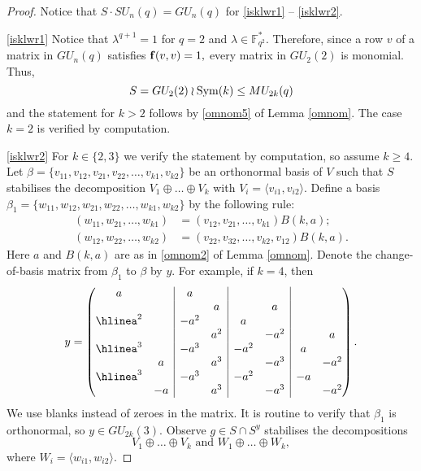 \begin{proof}
Notice that $S \cdot SU_n(q)=GU_n(q)$ for \eqref{isklwr1} -- \eqref{isklwr2}.  

\eqref{isklwr1} Notice that $\lambda^{q+1}=1$ for $q=2$ and $\lambda \in \mathbb{F}_{q^2}^*.$
Therefore, since  a row $v$ of a matrix in $GU_n(q)$ satisfies ${\bf f}(v,v)=1,$
every matrix in $GU_2(2)$ is  monomial. Thus, $$S=GU_2(2) \wr \mathrm{Sym}(k)\le MU_{2k}(q)$$ and  the statement for $k>2$ follows by \eqref{omnom5} of Lemma \ref{omnom}. The case $k=2$ is verified by computation.

\medskip

\eqref{isklwr2} For $k \in \{2,3\}$ we verify the statement by computation, so assume $k \ge 4.$ Let $\beta =\{v_{11}, v_{12}, v_{21}, v_{22}, \ldots, v_{k1}, v_{k2}\}$ be an orthonormal basis of $V$ such that $S$ stabilises the decomposition $V_1 \oplus \ldots \oplus V_k$ with $V_i=\langle v_{i1}, v_{i2} \rangle.$ Define a basis $\beta_1=\{w_{11}, w_{12}, w_{21}, w_{22}, \ldots, w_{k1}, w_{k2}\}$ by the following rule:
\begin{equation*}
\begin{split}
(w_{11}, w_{21}, \ldots, w_{k1})&=(v_{12}, v_{21}, \ldots, v_{k1})B(k,a); \\
(w_{12}, w_{22}, \ldots, w_{k2})&=(v_{22}, v_{32}, \ldots, v_{k2}, v_{12})B(k,a).
\end{split}
\end{equation*}
Here $a$ and $B(k,a)$ are as in \eqref{omnom2} of Lemma \ref{omnom}. Denote the change-of-basis matrix from $\beta_1$ to $\beta$ by $y$. For example, if $k=4$, then  
\begin{equation*}
y=
\begin{pmatrix}
a& \multicolumn{1}{c|}{}&a&\multicolumn{1}{c|}{}&&\multicolumn{1}{c|}{}&& \\
& \multicolumn{1}{c|}{}&&\multicolumn{1}{c|}{a}&&\multicolumn{1}{c|}{a}&& \\ \hline%
a^2& \multicolumn{1}{c|}{} &-a^2&\multicolumn{1}{c|}{}&a&\multicolumn{1}{c|}{}&& \\
  &\multicolumn{1}{c|}{} &&\multicolumn{1}{c|}{a^2}&&\multicolumn{1}{c|}{-a^2}&&a \\\hline%
a^3&\multicolumn{1}{c|}{} &-a^3&\multicolumn{1}{c|}{} &-a^2&\multicolumn{1}{c|}{}&a& \\
 &\multicolumn{1}{c|}{a}&&\multicolumn{1}{c|}{a^3}&&\multicolumn{1}{c|}{-a^3}&&-a^2 \\\hline%
a^3&\multicolumn{1}{c|}{} &-a^3&\multicolumn{1}{c|}{}&-a^2&\multicolumn{1}{c|}{}&-a& \\
& \multicolumn{1}{c|}{-a}&&\multicolumn{1}{c|}{a^3}&&\multicolumn{1}{c|}{-a^3}&&-a^2 \\ 
\end{pmatrix}.
\end{equation*}
We use blanks instead of zeroes in the matrix. It is routine to verify that $\beta_1$ is orthonormal, so $y \in GU_{2k}(3)$. Observe $g \in S \cap S^y$ stabilises the decompositions
$$V_1 \oplus \ldots \oplus V_k \text{ and  } W_1 \oplus \ldots \oplus W_k, $$
where $W_i=\langle w_{i1}, w_{i2} \rangle.$


\end{proof}
